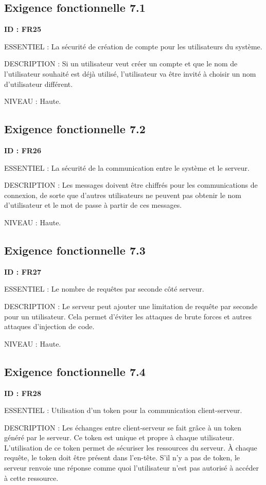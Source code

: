 \documentclass[titlepage, 12pt]{report}
\begin{document}
\subsection{Exigence fonctionnelle 7.1}

\textbf{ID : FR25}

ESSENTIEL : La sécurité de création de compte pour les utilisateurs du système.

DESCRIPTION : Si un utilisateur veut créer un compte et que le nom de l'utilisateur souhaité est déjà utilisé, l'utilisateur va être invité à choisir un nom d'utilisateur différent.

NIVEAU : Haute.

\subsection{Exigence fonctionnelle 7.2}

\textbf{ID : FR26}

ESSENTIEL : La sécurité de la communication entre le système et le serveur.

DESCRIPTION : Les messages doivent être chiffrés pour les communications de connexion, de sorte que d'autres utilisateurs ne peuvent pas obtenir le nom d'utilisateur et le mot de passe à partir de ces messages.

NIVEAU : Haute.

\subsection{Exigence fonctionnelle 7.3}

\textbf{ID : FR27}

ESSENTIEL : Le nombre de requêtes par seconde côté serveur.

DESCRIPTION : Le serveur peut ajouter une limitation de requête par seconde pour un utilisateur. Cela permet d'éviter les attaques de brute forces et autres attaques d'injection de code.

NIVEAU : Haute.

\subsection{Exigence fonctionnelle 7.4}

\textbf{ID : FR28}

ESSENTIEL : Utilisation d’un token pour la communication client-serveur.

DESCRIPTION : Les échanges entre client-serveur se fait grâce à un token généré par le serveur. Ce token est unique et propre à chaque utilisateur. L'utilisation de ce token permet de sécuriser les ressources du serveur. À chaque requête, le token doit être présent dans l'en-tête. S'il n'y a pas de token, le serveur renvoie une réponse comme quoi l'utilisateur n'est pas autorisé à accéder à cette ressource.
\end{document}
